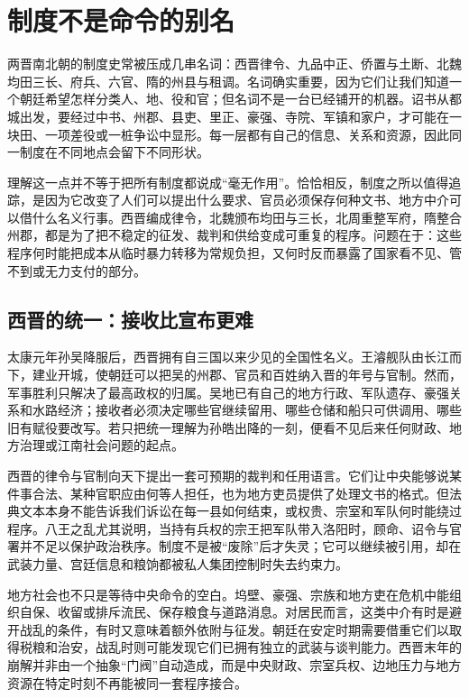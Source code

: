 \section{制度不是命令的别名}
\label{sec:synthesis-institutions}

两晋南北朝的制度史常被压成几串名词：西晋律令、九品中正、侨置与土断、北魏均田三长、府兵、六官、隋的州县与租调。名词确实重要，因为它们让我们知道一个朝廷希望怎样分类人、地、役和官；但名词不是一台已经铺开的机器。诏书从都城出发，要经过中书、州郡、县吏、里正、豪强、寺院、军镇和家户，才可能在一块田、一项差役或一桩争讼中显形。每一层都有自己的信息、关系和资源，因此同一制度在不同地点会留下不同形状。

理解这一点并不等于把所有制度都说成“毫无作用”。恰恰相反，制度之所以值得追踪，是因为它改变了人们可以提出什么要求、官员必须保存何种文书、地方中介可以借什么名义行事。西晋编成律令，北魏颁布均田与三长，北周重整军府，隋整合州郡，都是为了把不稳定的征发、裁判和供给变成可重复的程序。问题在于：这些程序何时能把成本从临时暴力转移为常规负担，又何时反而暴露了国家看不见、管不到或无力支付的部分。

\subsection{西晋的统一：接收比宣布更难}

太康元年孙吴降服后，西晋拥有自三国以来少见的全国性名义。王濬舰队由长江而下，建业开城，使朝廷可以把吴的州郡、官员和百姓纳入晋的年号与官制。然而，军事胜利只解决了最高政权的归属。吴地已有自己的地方行政、军队遗存、豪强关系和水路经济；接收者必须决定哪些官继续留用、哪些仓储和船只可供调用、哪些旧有赋役要改写。若只把统一理解为孙皓出降的一刻，便看不见后来任何财政、地方治理或江南社会问题的起点。

西晋的律令与官制向天下提出一套可预期的裁判和任用语言。它们让中央能够说某件事合法、某种官职应由何等人担任，也为地方吏员提供了处理文书的格式。但法典文本本身不能告诉我们诉讼在每一县如何结束，或权贵、宗室和军队何时能绕过程序。八王之乱尤其说明，当持有兵权的宗王把军队带入洛阳时，顾命、诏令与官署并不足以保护政治秩序。制度不是被“废除”后才失灵；它可以继续被引用，却在武装力量、宫廷信息和粮饷都被私人集团控制时失去约束力。

地方社会也不只是等待中央命令的空白。坞壁、豪强、宗族和地方吏在危机中能组织自保、收留或排斥流民、保存粮食与道路消息。对居民而言，这类中介有时是避开战乱的条件，有时又意味着额外依附与征发。朝廷在安定时期需要借重它们以取得税粮和治安，战乱时则可能发现它们已拥有独立的武装与谈判能力。西晋末年的崩解并非由一个抽象“门阀”自动造成，而是中央财政、宗室兵权、边地压力与地方资源在特定时刻不再能被同一套程序接合。

